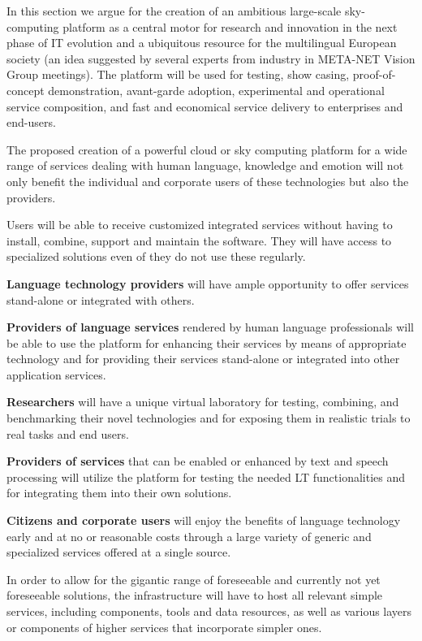 \documentclass[10pt, plain]{../../metanetpaper}
\begin{document}
\begin{multicols}{2}
In this section we argue for the creation of an ambitious large-scale sky-computing platform as a central motor for research and innovation in the next phase of IT evolution and a ubiquitous resource for the multilingual European society (an idea suggested by several experts from industry in META-NET Vision Group meetings). The platform will be used for testing, show casing, proof-of-concept demonstration, avant-garde adoption, experimental and operational service composition, and fast and economical service delivery to enterprises and end-users.
 
The proposed creation of a powerful cloud or sky computing platform for a wide range of services dealing with human language, knowledge and emotion will not only benefit the individual and corporate users of these technologies but also the providers.
 
Users will be able to receive customized integrated services without having to install, combine, support and maintain the software. They will have access to specialized solutions even of they do not use these regularly. 
 
\textbf{Language technology providers} will have ample opportunity to offer services stand-alone or integrated with others.
 
\textbf{Providers of language services} rendered by human language professionals will be able to use the platform for enhancing their services by means of appropriate technology and for providing their services stand-alone or integrated into other application services.
 
\textbf{Researchers} will have a unique virtual laboratory for testing, combining, and benchmarking their novel technologies and for exposing them in realistic trials to real tasks and end users.
 
\textbf{Providers of services} that can be enabled or enhanced by text and speech processing will utilize the platform for testing the needed LT functionalities and for integrating them into their own solutions.

\textbf{Citizens and corporate users} will enjoy the benefits of language technology early and at no or reasonable costs through a large variety of generic and specialized services offered at a single source.

In order to allow for the gigantic range of foreseeable and currently not yet foreseeable solutions, the infrastructure will have to host all relevant simple services, including components, tools and data resources, as well as various layers or components of higher services that incorporate simpler ones.
 

\end{multicols}
\end{document}
